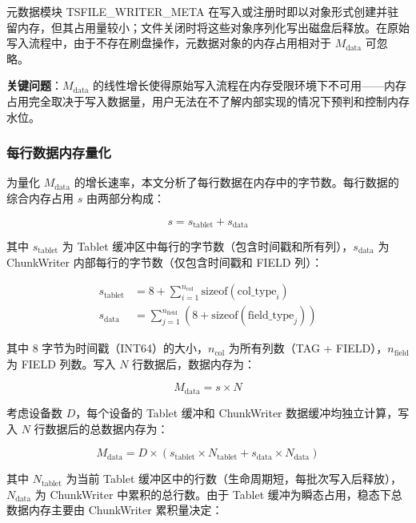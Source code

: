元数据模块 TSFILE\_WRITER\_META 在写入或注册时即以对象形式创建并驻留内存，但其占用量较小；文件关闭时将这些对象序列化写出磁盘后释放。在原始写入流程中，由于不存在刷盘操作，元数据对象的内存占用相对于 $M_{\text{data}}$ 可忽略。

\textbf{关键问题}：$M_{\text{data}}$ 的线性增长使得原始写入流程在内存受限环境下不可用——内存占用完全取决于写入数据量，用户无法在不了解内部实现的情况下预判和控制内存水位。

\subsubsection{每行数据内存量化}

为量化 $M_{\text{data}}$ 的增长速率，本文分析了每行数据在内存中的字节数。每行数据的综合内存占用 $s$ 由两部分构成：

\begin{equation}
  s = s_{\text{tablet}} + s_{\text{data}}
  \label{eq:s-per-row}
\end{equation}

其中 $s_{\text{tablet}}$ 为 Tablet 缓冲区中每行的字节数（包含时间戳和所有列），$s_{\text{data}}$ 为 ChunkWriter 内部每行的字节数（仅包含时间戳和 FIELD 列）：

\begin{align}
  s_{\text{tablet}} &= 8 + \sum_{i=1}^{n_{\text{col}}} \text{sizeof}(\text{col\_type}_i) \label{eq:s-tablet} \\
  s_{\text{data}} &= \sum_{j=1}^{n_{\text{field}}} \left(8 + \text{sizeof}(\text{field\_type}_j)\right) \label{eq:s-data}
\end{align}

其中 8 字节为时间戳（INT64）的大小，$n_{\text{col}}$ 为所有列数（TAG + FIELD），$n_{\text{field}}$ 为 FIELD 列数。写入 $N$ 行数据后，数据内存为：

\begin{equation}
  M_{\text{data}} = s \times N
  \label{eq:m-data-orig}
\end{equation}

考虑设备数 $D$，每个设备的 Tablet 缓冲和 ChunkWriter 数据缓冲均独立计算，写入 $N$ 行数据后的总数据内存为：

\begin{equation}
  M_{\text{data}} = D \times \left( s_{\text{tablet}} \times N_{\text{tablet}} + s_{\text{data}} \times N_{\text{data}} \right)
  \label{eq:m-data-full}
\end{equation}

其中 $N_{\text{tablet}}$ 为当前 Tablet 缓冲区中的行数（生命周期短，每批次写入后释放），$N_{\text{data}}$ 为 ChunkWriter 中累积的总行数。由于 Tablet 缓冲为瞬态占用，稳态下总数据内存主要由 ChunkWriter 累积量决定：

